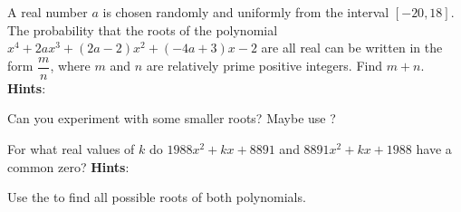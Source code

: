 \documentclass[11pt,titlepage]{scrartcl}
\newenvironment{hint}{\footnotesize \normalfont \textbf{Hints}:}{\hspace{-0.5ex}}
\begin{document}
\begin{exercisebox}
\begin{exercise}
A real number $a$ is chosen randomly and uniformly from the interval $[-20, 18]$. The probability that the roots of the polynomial
$x^4 + 2ax^3 + (2a - 2)x^2 + (-4a + 3)x - 2$
are all real can be written in the form $\dfrac{m}{n}$, where $m$ and $n$ are relatively prime positive integers. Find $m + n$.
\begin{hint}
\begin{addhint}{
Can you experiment with some smaller roots? Maybe use ?
}\end{addhint}
\end{hint}
\end{exercise}
\begin{exercise}
For what real values of $k$ do $1988x^2 + kx + 8891$ and $8891x^2 + kx + 1988$ have a common zero?
\begin{hint}
\begin{addhint}{
Use the  to find all possible roots of both polynomials.
}\end{addhint}
\end{hint}
\end{exercise}
\end{exercisebox}
\end{document}
